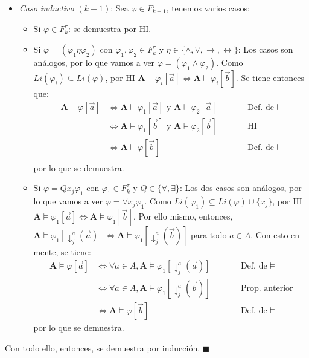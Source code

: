 \documentclass{article}
\begin{document}
\begin{itemize}
  \item \textit{Caso inductivo} $(k+1)$: Sea $\varphi\in F^\tau_{k+1}$, tenemos varios casos:
        \begin{itemize}
          \item Si $\varphi\in F^\tau_k$: se demuestra por HI.
          \item Si $\varphi=(\varphi_1\eta\varphi_2)$ con $\varphi_1,\varphi_2\in F^\tau_k$ y $\eta\in\{\land,\lor,\to,\leftrightarrow\}$: Los casos son análogos, por lo que vamos a ver $\varphi=(\varphi_1\land\varphi_2)$. Como $Li(\varphi_i)\subseteq Li(\varphi)$, por HI $\mathbf{A}\vDash\varphi_i[\vec{a}]\iff\mathbf{A}\vDash\varphi_i[\vec{b}]$. Se tiene entonces que:
                \begin{equation*}
                  \begin{alignedat}{2}
                    \mathbf{A}\vDash\varphi[\vec{a}] & \iff \mathbf{A}\vDash\varphi_1[\vec{a}]\text{ y }\mathbf{A}\vDash\varphi_2[\vec{a}] &  & \qquad\text{Def. de }\vDash \\
                                                     & \iff \mathbf{A}\vDash\varphi_1[\vec{b}]\text{ y }\mathbf{A}\vDash\varphi_2[\vec{b}] &  & \qquad\text{HI}             \\
                                                     & \iff \mathbf{A}\vDash\varphi[\vec{b}]                                               &  & \qquad\text{Def. de }\vDash \\
                  \end{alignedat}
                \end{equation*}
                por lo que se demuestra.
          \item Si $\varphi=Qx_j\varphi_1$ con $\varphi_1\in F^\tau_k$ y $Q\in\{\forall,\exists\}$: Los dos casos son análogos, por lo que vamos a ver $\varphi=\forall x_j\varphi_1$. Como $Li(\varphi_1)\subseteq Li(\varphi)\cup\{x_j\}$, por HI $\mathbf{A}\vDash\varphi_1[\vec{a}]\iff\mathbf{A}\vDash\varphi_1[\vec{b}]$. Por ello mismo, entonces, $\mathbf{A}\vDash\varphi_1[\downarrow^a_j(\vec{a})]\iff\mathbf{A}\vDash\varphi_1[\downarrow^a_j(\vec{b})]$ para todo $a\in A$. Con esto en mente, se tiene:
                \begin{equation*}
                  \begin{alignedat}{2}
                    \mathbf{A}\vDash\varphi[\vec{a}] & \iff \forall a\in A,\mathbf{A}\vDash\varphi_1[\downarrow^a_j(\vec{a})] &  & \qquad\text{Def. de }\vDash \\
                                                     & \iff \forall a\in A,\mathbf{A}\vDash\varphi_1[\downarrow^a_j(\vec{b})] &  & \qquad\text{Prop. anterior} \\
                                                     & \iff \mathbf{A}\vDash\varphi[\vec{b}]                                  &  & \qquad\text{Def. de }\vDash
                  \end{alignedat}
                \end{equation*}
                por lo que se demuestra.
        \end{itemize}
\end{itemize}

Con todo ello, entonces, se demuestra por inducción. $\blacksquare$
\end{document}
